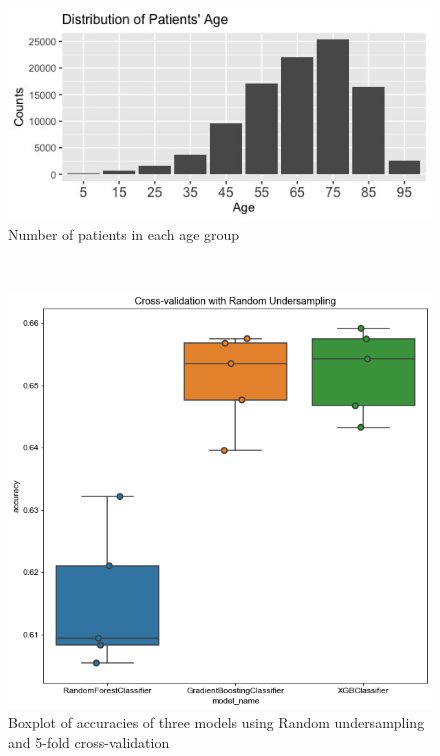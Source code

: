 \documentclass[letterpaper, 10 pt, conference]{ieeeconf}  %
\begin{document}
\begin{figure}[!hbt]
\centering
\includegraphics[width=1\columnwidth]{Rplot07.png}
\caption{Number of patients in each age group}
\label{age}
\end{figure}\\

\begin{figure}[!hbt]
\centering
\includegraphics[width=1\columnwidth]{rusbp.png}
\caption{Boxplot of accuracies of three models using Random undersampling and 5-fold cross-validation}
\label{rusbp}
\end{figure}
\end{document}
